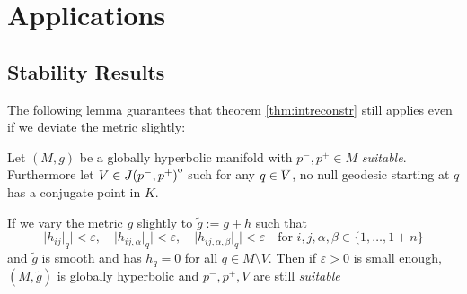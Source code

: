 \chapter{Applications}

\section{Stability Results}

The following lemma guarantees that theorem \ref{thm:intreconstr} still applies even if we deviate the metric slightly:
\begin{lemma}
    Let $(M,g)$ be a globally hyperbolic manifold with $p^-,p^+\in M$ \emph{suitable}. Furthermore let $V\in {\kern0ptJ(p^-,p^+)}^{\mathrm{o}}$ such for any $q\in {\overline{V}}$, no null geodesic starting at $q$ has a conjugate point in $K$.

    If we vary the metric $g$ slightly to $\widetilde{g}:=g+h$ such that 
    \[
        \lvert h_{ij}\rvert_q \rvert <\varepsilon, \quad \lvert h_{ij,\alpha}\rvert_q \rvert <\varepsilon, \quad \lvert h_{ij,\alpha,\beta}\rvert_q \rvert <\varepsilon \quad \text{for }i,j,\alpha,\beta\in \{1,\dots, 1+n\}
    \]
    and $\widetilde{g}$ is smooth and has $h_q=0$ for all $q\in M\setminus V$. Then if $\varepsilon>0$ is small enough, $(M,\widetilde{g})$ is globally hyperbolic and $p^-,p^+,V$ are still \emph{suitable}
\end{lemma}
